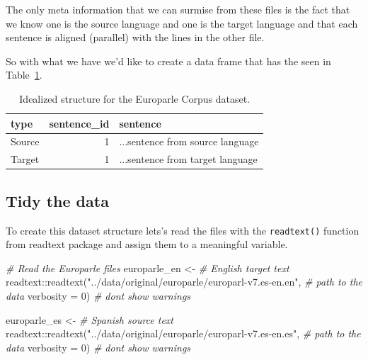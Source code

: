 \documentclass[
  letterpaper,
]{scrbook}
\newenvironment{Shaded}{\begin{snugshade}}{\end{snugshade}}
\newcommand{\AttributeTok}[1]{\textcolor[rgb]{0.00,0.00,0.00}{#1}}
\newcommand{\CommentTok}[1]{\textcolor[rgb]{0.00,0.00,0.00}{\textit{#1}}}
\newcommand{\DecValTok}[1]{\textcolor[rgb]{0.00,0.00,0.00}{#1}}
\newcommand{\FunctionTok}[1]{\textcolor[rgb]{0.00,0.00,0.00}{#1}}
\newcommand{\NormalTok}[1]{\textcolor[rgb]{0.00,0.00,0.00}{#1}}
\newcommand{\OtherTok}[1]{\textcolor[rgb]{0.00,0.00,0.00}{#1}}
\newcommand{\SpecialCharTok}[1]{\textcolor[rgb]{0.00,0.00,0.00}{#1}}
\newcommand{\StringTok}[1]{\textcolor[rgb]{0.00,0.00,0.00}{#1}}
\begin{document}
The only meta information that we can surmise from these files is the
fact that we know one is the source language and one is the target
language and that each sentence is aligned (parallel) with the lines in
the other file.

So with what we have we'd like to create a data frame that has the seen
in Table~\ref{tbl-cd-unstructured-europarle-structure-example}.

\hypertarget{tbl-cd-unstructured-europarle-structure-example}{}
\begin{table}
\caption{\label{tbl-cd-unstructured-europarle-structure-example}Idealized structure for the Europarle Corpus dataset. }\tabularnewline

\centering
\begin{tabular}{lrl}
\toprule
type & sentence\_id & sentence\\
\midrule
Source & 1 & ...sentence from source language\\
Target & 1 & ...sentence from target language\\
\bottomrule
\end{tabular}
\end{table}

\hypertarget{tidy-the-data}{%
\subsection{Tidy the data}\label{tidy-the-data}}

To create this dataset structure lets's read the files with the
\texttt{readtext()} function from readtext package and assign them to a
meaningful variable.

\begin{Shaded}
\begin{Highlighting}[]
\CommentTok{\# Read the Europarle files}
\NormalTok{europarle\_en }\OtherTok{\textless{}{-}}  \CommentTok{\# English target text}
\NormalTok{  readtext}\SpecialCharTok{::}\FunctionTok{readtext}\NormalTok{(}\StringTok{"../data/original/europarle/europarl{-}v7.es{-}en.en"}\NormalTok{, }\CommentTok{\# path to the data}
                     \AttributeTok{verbosity =} \DecValTok{0}\NormalTok{) }\CommentTok{\# don\textquotesingle{}t show warnings}

\NormalTok{europarle\_es }\OtherTok{\textless{}{-}} \CommentTok{\# Spanish source text}
\NormalTok{  readtext}\SpecialCharTok{::}\FunctionTok{readtext}\NormalTok{(}\StringTok{"../data/original/europarle/europarl{-}v7.es{-}en.es"}\NormalTok{, }\CommentTok{\# path to the data}
                     \AttributeTok{verbosity =} \DecValTok{0}\NormalTok{) }\CommentTok{\# don\textquotesingle{}t show warnings}
\end{Highlighting}
\end{Shaded}
\end{document}
